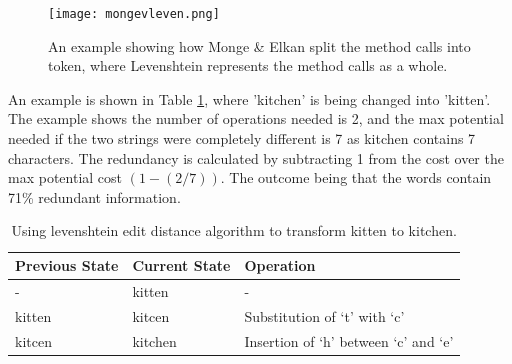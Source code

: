 \begin{figure}[h]
\begin{center}
\texttt{[image: mongevleven.png]}
\end{center}
\caption{An example showing how Monge \& Elkan split the method calls into token, where Levenshtein represents the method calls as a whole.}
\label{fig:mongevleven}
\end{figure}

An example is shown in Table \ref{levenTable}, where 'kitchen' is being changed into 'kitten'. The example shows the number of operations needed is 2, and the max potential needed if the two strings were completely different is 7 as kitchen contains 7 characters. The redundancy is calculated by subtracting 1 from the cost over the max potential cost $(1 - (2/7)) $. The outcome being that the words contain 71\% redundant information. 

\begin{table}[]
\centering

\begin{tabular}{|l|l|l|}
\hline
{\bf Previous State} & {\bf Current State} & {\bf Operation}                      \\ \hline
-                    & kitten              & -                                    \\ \hline
kitten               & kitcen              & Substitution of `t' with `c'         \\ \hline
kitcen               & kitchen             & Insertion of `h' between `c' and `e' \\ \hline
\end{tabular}
\caption{Using levenshtein edit distance algorithm to transform kitten to kitchen.}
\label{levenTable}
\end{table}

